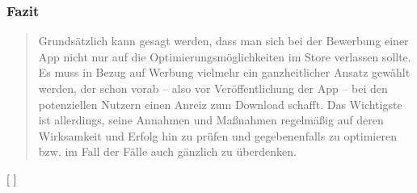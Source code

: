 \documentclass[FIPLY_base.tex]{subfiles}
\begin{document}
\subsubsection{Fazit}
\begin{quote}\grqq{}Grundsätzlich kann gesagt werden, dass man sich bei der Bewerbung einer App nicht nur auf die Optimierungsmöglichkeiten im Store verlassen sollte. Es muss in Bezug auf Werbung vielmehr ein ganzheitlicher Ansatz gewählt werden, der schon vorab – also vor Veröffentlichung der App – bei den potenziellen Nutzern einen Anreiz zum Download schafft. Das Wichtigste ist allerdings, seine Annahmen und Maßnahmen regelmäßig auf deren Wirksamkeit und Erfolg hin zu prüfen und gegebenenfalls zu optimieren bzw. im Fall der Fälle auch gänzlich zu überdenken.\grqq{}\end{quote}
[ \cite{promteil2}]
\end{document}

